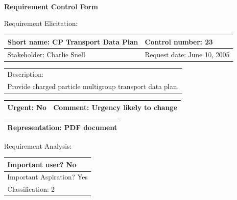 \begin{center}\Large\bf
Requirement Control Form
\end{center}
\vspace{24pt}

Requirement Elicitation:

\begin{tabular}{|p{211pt}|p{211pt}|} \hline
Short name: CP Transport Data Plan & Control number: 23\\ \hline
Stakeholder: Charlie Snell & Request date: June 10, 2005\\
\end{tabular}
\begin{tabular}{|p{433pt}|} \hline
Description: \\ 
Provide charged particle multigroup transport data plan. \\
\hline
\end{tabular} 
\begin{tabular}{|p{211pt}|p{211pt}|} \hline
Urgent: No & Comment: Urgency likely to change\\ \hline
\end{tabular}

\vspace{12pt}

\begin{tabular}{|p{433pt}|} \hline
Representation: PDF document \\ \hline
\end{tabular}
\vspace{24pt}

Requirement Analysis:

\begin{tabular}{|p{433pt}|} \hline
Important user? No \\ \hline
Important Aspiration? Yes \\ \hline
Classification: 2 \\ \hline
\end{tabular}
\vspace{24pt}
